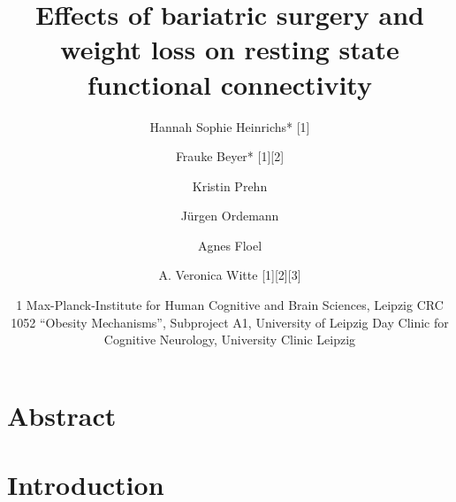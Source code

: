 \documentclass[
]{article}
\title{Effects of bariatric surgery and weight loss on resting state functional connectivity}
\author{Hannah Sophie Heinrichs* {[}1{]} \and Frauke Beyer* {[}1{]}{[}2{]} \and Kristin Prehn \and Jürgen Ordemann \and Agnes Floel \and A. Veronica Witte {[}1{]}{[}2{]}{[}3{]}}
\date{1 Max-Planck-Institute for Human Cognitive and Brain Sciences, Leipzig \newline 2 CRC 1052 ``Obesity Mechanisms'', Subproject A1, University of Leipzig \newline 3 Day Clinic for Cognitive Neurology, University Clinic Leipzig}
\begin{document}
\maketitle

{
\setcounter{tocdepth}{2}
\tableofcontents
}
\newpage

\hypertarget{abstract}{%
\section{Abstract}\label{abstract}}

\newpage

\hypertarget{introduction}{%
\section{Introduction}\label{introduction}}
\end{document}
